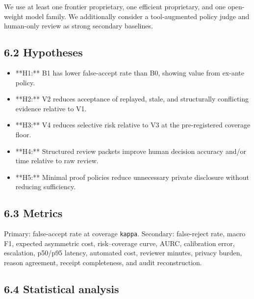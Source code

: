 \documentclass[11pt]{article}
\begin{document}
We use at least one frontier proprietary, one efficient proprietary, and one open-weight model family. We additionally consider a tool-augmented policy judge and human-only review as strong secondary baselines.\par

\subsection{6.2 Hypotheses}

\begin{itemize}\item **H1:** B1 has lower false-accept rate than B0, showing value from ex-ante policy.\end{itemize}
\begin{itemize}\item **H2:** V2 reduces acceptance of replayed, stale, and structurally conflicting evidence relative to V1.\end{itemize}
\begin{itemize}\item **H3:** V4 reduces selective risk relative to V3 at the pre-registered coverage floor.\end{itemize}
\begin{itemize}\item **H4:** Structured review packets improve human decision accuracy and/or time relative to raw review.\end{itemize}
\begin{itemize}\item **H5:** Minimal proof policies reduce unnecessary private disclosure without reducing sufficiency.\end{itemize}

\subsection{6.3 Metrics}

Primary: false-accept rate at coverage \texttt{kappa}. Secondary: false-reject rate, macro F1, expected asymmetric cost, risk--coverage curve, AURC, calibration error, escalation, p50/p95 latency, automated cost, reviewer minutes, privacy burden, reason agreement, receipt completeness, and audit reconstruction.\par

\subsection{6.4 Statistical analysis}
\end{document}
